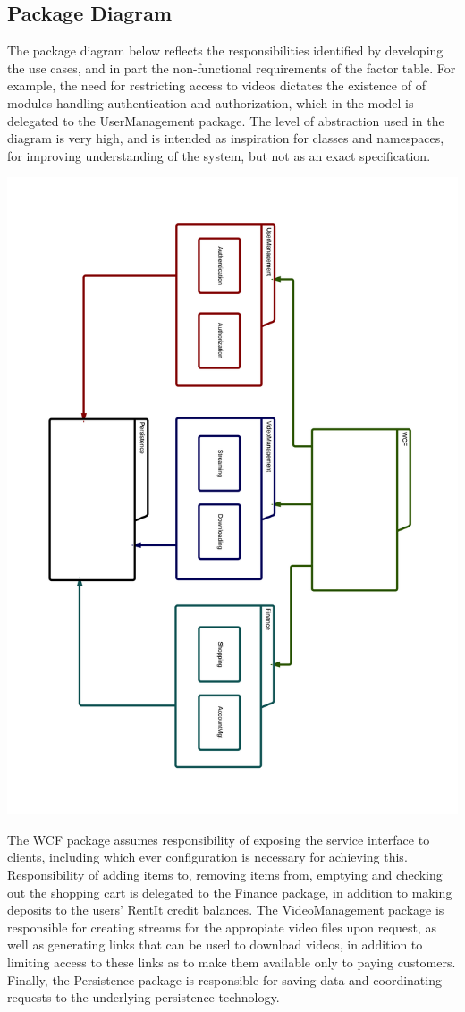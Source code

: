 \subsection{Package Diagram}
The package diagram below reflects the responsibilities identified by developing the use cases, and in part the non-functional requirements of the factor table. For example, the need for restricting access to videos dictates the existence of of modules handling authentication and authorization, which in the model is delegated to the UserManagement package. The level of abstraction used in the diagram is very high, and is intended as inspiration for classes and namespaces, for improving understanding of the system, but not as an exact specification.
\begin{center}
\includegraphics[scale=0.15]{PackageDiagram.png}
\end{center}
The WCF package assumes responsibility of exposing the service interface to clients, including which ever configuration is necessary for achieving this. Responsibility of adding items to, removing items from, emptying and checking out the shopping cart is delegated to the Finance package, in addition to making deposits to the users' RentIt credit balances.
The VideoManagement package is responsible for creating streams for the appropiate video files upon request, as well as generating links that can be used to download videos, in addition to limiting access to these links as to make them available only to paying customers. Finally, the Persistence package is responsible for saving data and coordinating requests to the underlying persistence technology.

